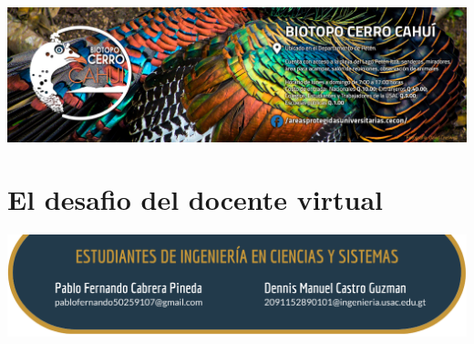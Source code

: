 \documentclass[12pt,spanish,Letterpaper,openany]{book}
\begin{document}
\begin{center}\includegraphics[width=1\linewidth]{images/publicidad7} \end{center}

\hypertarget{pareja35}{%
\chapter{El desafio del docente virtual}\label{pareja35}}

\begin{center}\includegraphics[width=1\linewidth]{images/pareja35_image1} \end{center}
\end{document}
